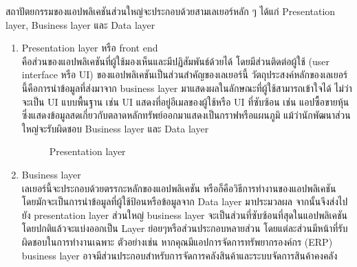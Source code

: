 \documentclass[14pt,oneside,openright,a4paper]{cpe-thai-project}
\begin{document}
สถาปัตยกรรมของแอปพลิเคชันส่วนใหญ่จะประกอบด้วยสามเลเยอร์หลัก ๆ ได้แก่ Presentation layer, Business layer และ Data layer
  \begin{enumerate} 
    \item Presentation layer หรือ front end \cite{MobileAppArchitecture} \\
          คือส่วนของแอปพลิเคชันที่ผู้ใช้มองเห็นและมีปฏิสัมพันธ์ด้วยได้ โดยมีส่วนติดต่อผู้ใช้ (user interface หรือ UI) ของแอปพลิเคชันเป็นส่วนสำคัญของเลเยอร์นี้
          วัตถุประสงค์หลักของเลเยอร์นี้คือการนำข้อมูลที่ส่งมาจาก business layer มาแสดงผลในลักษณะที่ผู้ใช้สามารถเข้าใจได้
          ไม่ว่าจะเป็น UI แบบพื้นฐาน เช่น UI แสดงที่อยู่อีเมลของผู้ใช้หรือ UI ที่ซับซ้อน เช่น แอปซื้อขายหุ้นซึ่งแสดงข้อมูลสดเกี่ยวกับตลาดหลักทรัพย์ออกมาแสดงเป็นกราฟหรือแผนภูมิ แม้ว่านักพัฒนาส่วนใหญ่จะรับผิดชอบ Business layer และ Data layer

      \begin{figure}[!h]\centering
        \setlength{\fboxrule}{0.5mm} %
        \setlength{\fboxsep}{0.5cm}
        \caption{Presentation layer \cite{PresentationLayer}}\label{fig:mobile_arc2}
      \end{figure}

\newpage

    \item Business layer \cite{MobileAppArchitecture} \\
          เลเยอร์นี้จะประกอบด้วยตรรกะหลักของแอปพลิเคชัน หรือก็คือวิธีการทำงานของแอปพลิเคชัน โดยมักจะเป็นการนำข้อมูลที่ผู้ใช้ป้อนหรือข้อมูลจาก Data layer มาประมวลผล จากนั้นจึงส่งไปยัง presentation layer
          ส่วนใหญ่ business layer จะเป็นส่วนที่ซับซ้อนที่สุดในแอปพลิเคชัน 
          โดยปกติแล้วจะแบ่งออกเป็น Layer ย่อยๆหรือส่วนประกอบหลายส่วน โดยแต่ละส่วนมีหน้าที่รับผิดชอบในการทำงานเฉพาะ
          ตัวอย่างเช่น หากคุณมีแอปการจัดการทรัพยากรองค์กร (ERP) business layer อาจมีส่วนประกอบสำหรับการจัดการคลังสินค้าและระบบจัดการสินค้าคงคลัง 


\end{enumerate}
\end{document}
